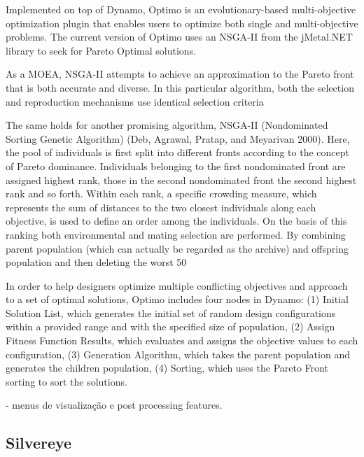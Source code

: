 Implemented on top of Dynamo, Optimo is an evolutionary-based multi-objective optimization plugin that enables users to optimize both single and multi-objective problems. The current version of Optimo uses an \ac{NSGA}-II \cite{Deb2002NSGA-II} from the jMetal.NET library to seek for Pareto Optimal solutions. 

As a \ac{MOEA}, \ac{NSGA}-II attempts to achieve an approximation to the Pareto front that is both accurate and diverse. In this particular algorithm, both the selection and reproduction mechanisms use identical selection criteria



The same holds for another promising algorithm, NSGA-II (Nondominated Sorting Genetic Algorithm) (Deb, Agrawal, Pratap, and Meyarivan 2000). Here, the pool of individuals is first split into different fronts according to the concept of Pareto dominance. Individuals belonging to the first nondominated front are assigned highest rank, those in the second nondominated front the second highest rank and so forth. Within each rank, a specific crowding measure, which represents the sum of distances to the two closest individuals along each objective, is used to define an order among the individuals. On the basis of this ranking both environmental and mating selection are performed. By combining parent population (which can actually be regarded as the archive) and offspring population and then deleting the worst 50%



In order to help designers optimize multiple conflicting objectives and approach to a set of optimal solutions, Optimo includes four nodes in Dynamo: (1) Initial Solution List, which generates the initial set of random design configurations within a provided range and with the specified size of population, (2) Assign Fitness Function Results, which evaluates and assigns the objective values to each configuration, (3) Generation Algorithm, which takes the parent population and generates the children population, (4) Sorting, which uses the Pareto Front sorting to sort the solutions. 

- menus de visualização e post processing features.




\subsection{Silvereye}

